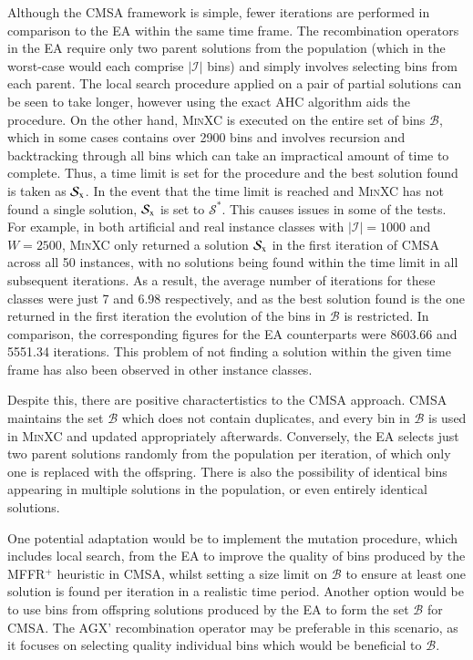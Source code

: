 \documentclass[authoryear]{elsarticle}
\begin{document}
Although the CMSA framework is simple, fewer iterations are performed in comparison to the EA within the same time frame. The recombination operators in the EA require only two parent solutions from the population (which in the worst-case would each comprise $|\mathcal{I}|$ bins) and simply involves selecting bins from each parent. The local search procedure applied on a pair of partial solutions can be seen to take longer, however using the exact AHC algorithm aids the procedure. On the other hand, \textsc{MinXC} is executed on the entire set of bins $\mathcal{B}$, which in some cases contains over 2900 bins and involves recursion and backtracking through all bins which can take an impractical amount of time to complete. Thus, a time limit is set for the procedure and the best solution found is taken as $\mathcal{S}_{\textup{x}}$. In the event that the time limit is reached and \textsc{MinXC} has not found a single solution, $\mathcal{S}_{\textup{x}}$ is set to $\mathcal{S}^*$. This causes issues in some of the tests. For example, in both artificial and real instance classes with $|\mathcal{I}| = 1000$ and $W =2500$, \textsc{MinXC} only returned a solution $\mathcal{S}_{\textup{x}}$ in the first iteration of CMSA across all 50 instances, with no solutions being found within the time limit in all subsequent iterations. As a result, the average number of iterations for these classes were just 7 and 6.98 respectively, and as the best solution found is the one returned in the first iteration the evolution of the bins in $\mathcal{B}$ is restricted. In comparison, the corresponding figures for the EA counterparts were 8603.66 and 5551.34 iterations. This problem of not finding a solution within the given time frame has also been observed in other instance classes.

Despite this, there are positive charactertistics to the CMSA approach. CMSA maintains the set $\mathcal{B}$ which does not contain duplicates, and every bin in $\mathcal{B}$ is used in \textsc{MinXC} and updated appropriately afterwards. Conversely, the EA selects just two parent solutions randomly from the population per iteration, of which only one is replaced with the offspring. There is also the possibility of identical bins appearing in multiple solutions in the population, or even entirely identical solutions. 

One potential adaptation would be to implement the mutation procedure, which includes local search, from the EA to improve the quality of bins produced by the MFFR$^+$ heuristic in CMSA, whilst setting a size limit on $\mathcal{B}$ to ensure at least one solution is found per iteration in a realistic time period. Another option would be to use bins from offspring solutions produced by the EA to form the set $\mathcal{B}$ for CMSA. The AGX' recombination operator may be preferable in this scenario, as it focuses on selecting quality individual bins which would be beneficial to $\mathcal{B}$.
\end{document}

